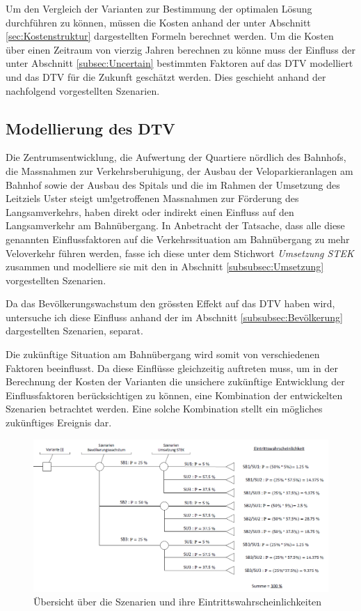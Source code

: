 Um den Vergleich der Varianten zur Bestimmung der optimalen Lösung durchführen zu können, müssen die Kosten anhand der unter Abschnitt \ref{sec:Kostenstruktur} dargestellten Formeln berechnet werden. Um die Kosten über einen Zeitraum von vierzig Jahren berechnen zu könne muss der Einfluss der unter Abschnitt \ref{subsec:Uncertain} bestimmten Faktoren auf das DTV modelliert und das DTV für die Zukunft geschätzt werden. Dies geschieht anhand der nachfolgend vorgestellten Szenarien.


	\subsection{Modellierung des DTV}
	\label{subsec:Modellierung}
	
Die Zentrumsentwicklung, die Aufwertung der Quartiere nördlich des Bahnhofs, die Massnahmen zur Verkehrsberuhigung, der Ausbau der Veloparkieranlagen am Bahnhof sowie der Ausbau des Spitals und die im Rahmen der Umsetzung des Leitziels \flqq Uster steigt um!\frqq getroffenen Massnahmen zur Förderung des Langsamverkehrs, haben direkt oder indirekt einen Einfluss auf den Langsamverkehr am Bahnübergang. In Anbetracht der Tatsache, dass alle diese genannten Einflussfaktoren auf die Verkehrssituation am Bahnübergang zu mehr Veloverkehr führen werden, fasse ich diese unter dem Stichwort \textit{Umsetzung STEK} zusammen und modelliere sie mit den in Abschnitt \ref{subsubsec:Umsetzung} vorgestellten Szenarien.

Da das Bevölkerungswachstum den grössten Effekt auf das DTV haben wird, untersuche ich diese Einfluss anhand der im Abschnitt \ref{subsubsec:Bevölkerung} dargestellten Szenarien, separat. 

Die zukünftige Situation am Bahnübergang wird somit von verschiedenen Faktoren beeinflusst. Da diese Einflüsse gleichzeitig auftreten muss, um in der Berechnung der Kosten der Varianten die unsichere zukünftige Entwicklung der Einflussfaktoren berücksichtigen zu können, eine Kombination der entwickelten Szenarien betrachtet werden. Eine solche Kombination stellt ein mögliches zukünftiges Ereignis dar. 

\begin{figure}[h!]
	\centering
	\includegraphics[width=\textwidth]{figures/f-04-06-01-Entscheidungsbaum-Szenarien}
	\caption[Szenarienübersicht]{Übersicht über die Szenarien und ihre Eintrittswahrscheinlichkeiten}
	\label{img:EntscheidungSzenarien}
\end{figure}

